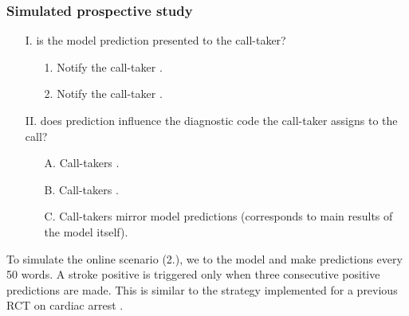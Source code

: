 \begin{frame}
    \frametitle{Simulated prospective study}
    \begin{enumerate}
        \item[I.]  is the model prediction presented to the call-taker?
        \begin{enumerate}
            \item[1.] Notify the call-taker .
            \item[2.] Notify the call-taker .
        \end{enumerate}
        \item[II.]  does prediction influence the diagnostic code the call-taker assigns to the call?
        \begin{enumerate}[label=\Alph*.]
            \item[A.] Call-takers .
            \item[B.] Call-takers .
            \item[C.] Call-takers mirror model predictions (corresponds to main results of the model itself).
        \end{enumerate}
    \end{enumerate}
    \vspace{0.5em}
    To simulate the online scenario (2.), we  to the model and make predictions every 50 words. 
    A stroke positive is triggered only when three consecutive positive predictions are made. 
    This is similar to the strategy implemented for a previous RCT on cardiac arrest \cite{cite15}.

        
\end{frame}


